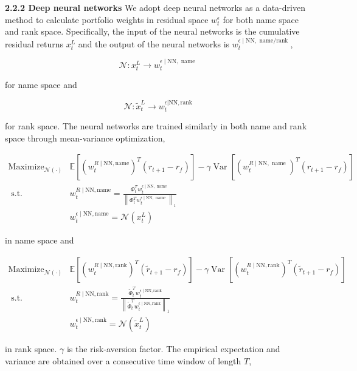 \documentclass[12pt,article]{memoir}
\begin{document}
\textbf{2.2.2 Deep neural networks}
We adopt deep neural networks as a data-driven method to calculate portfolio weights in residual space $w_t^\epsilon$ for both name space and rank space. Specifically, the input of the neural networks is the cumulative residual returns $x_t^L$ and the output of the neural networks is $w_t^{\epsilon \mid \mathrm{NN}, \text { name/rank }}$,

$$
\mathcal{N}: x_t^L \rightarrow w_t^{\epsilon \mid \mathrm{NN}, \text { name }}
$$

for name space and

$$
\mathcal{N}: \tilde{x}_t^L \rightarrow w_t^{\epsilon | \mathrm{NN}, \mathrm{rank}}
$$

for rank space. The neural networks are trained similarly in both name and rank space through mean-variance optimization,

$$
\begin{aligned}
\operatorname{Maximize}_{\mathcal{N}(\cdot)} & \mathbb{E}\left[\left(w_t^{R \mid \mathrm{NN}, \mathrm{name}}\right)^T\left(r_{t+1}-r_f\right)\right]-\gamma \operatorname{Var}\left[\left(w_t^{R \mid \mathrm{NN}, \text { name }}\right)^T\left(r_{t+1}-r_f\right)\right] \\
\text { s.t. } & w_t^{R \mid \mathrm{NN}, \mathrm{name}}=\frac{\Phi_t^T w_t^{\epsilon \mid \mathrm{NN}, \text { name }}}{\left\|\Phi_t^T w_t^{\epsilon \mid \mathrm{NN}, \text { name }}\right\|_1} \\
& w_t^{\epsilon \mid \mathrm{NN}, \mathrm{name}}=\mathcal{N}\left(x_t^L\right)
\end{aligned}
$$

in name space and

$$
\begin{aligned}
\operatorname{Maximize}_{\mathcal{N}(\cdot)} & \mathbb{E}\left[\left(w_t^{R \mid \mathrm{NN}, \mathrm{rank}}\right)^T\left(\tilde{r}_{t+1}-r_f\right)\right]-\gamma \operatorname{Var}\left[\left(w_t^{R \mid \mathrm{NN}, \mathrm{rank}}\right)^T\left(\tilde{r}_{t+1}-r_f\right)\right] \\
\text { s.t. } & w_t^{R \mid \mathrm{NN}, \mathrm{rank}}=\frac{\tilde{\Phi}_t^T w_t^{\epsilon \mid \mathrm{NN}, \mathrm{rank}}}{\left\|\tilde{\Phi}_t^T w_t^{\epsilon \mid \mathrm{NN}, \mathrm{rank}}\right\|_1} \\
& w_t^{\epsilon \mid \mathrm{NN}, \mathrm{rank}}=\mathcal{N}\left(\tilde{x}_t^L\right)
\end{aligned}
$$

in rank space. $\gamma$ is the risk-aversion factor. The empirical expectation and variance are obtained over a consecutive time window of length $T$,
\end{document}
